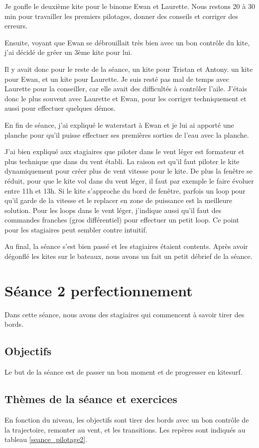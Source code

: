 \documentclass[11pt,a4paper]{report}
\begin{document}
Je gonfle le deuxième kite pour le binome Ewan et Laurette.
Nous restons 20 à 30 min pour travailler les premiers pilotages,
donner des conseils et corriger des erreurs.

Ensuite, voyant que Ewan se débrouillait très bien avec un bon contrôle du 
kite, j'ai décidé de gréer un 3ème kite pour lui.

Il y avait donc pour le reste de la séance, un kite pour Tristan et Antony.
un kite pour Ewan, et un kite pour Laurette. Je suis resté pas mal de temps
avec Laurette pour la conseiller, car elle avait des difficultés à contrôler l'aile.
J'étais donc le plus souvent avec Laurette et Ewan, pour les corriger techniquement 
et aussi pour effectuer quelques démos.

En fin de séance, j'ai expliqué le waterstart à Ewan et je lui ai
apporté une planche pour qu'il puisse effectuer ses premières sorties
de l'eau avec la planche.

J'ai bien expliqué aux stagiaires que piloter dans le vent léger est
formateur et plus technique que dans du vent établi. La raison est qu'il faut
piloter le kite dynamiquement pour créer plus de vent vitesse pour le kite.
De plus la fen\^etre se réduit, pour que le kite vol dans du vent léger, 
il faut par exemple le faire évoluer entre 11h et 13h. Si le kite s'approche du 
bord de fen\^etre, parfois un loop pour qu'il garde de la vitesse et le replacer
en zone de puissance est la meilleure solution.
Pour les loops dans le vent léger, j'indique aussi qu'il faut
des commandes franches (gros différentiel) pour effectuer un petit loop.
Ce point pour les stagiaires peut sembler contre intuitif.

Au final, la séance s'est bien passé et les stagiaires étaient contents.
Après avoir dégonflé les kites sur le bateaux, nous avons un fait un
petit débrief de la séance.

\section{Séance 2 perfectionnement}
Dans cette séance, nous avons des stagiaires qui commencent à savoir tirer des bords.
\subsection{Objectifs}
Le but de la séance est de passer un bon moment et de progresser en kitesurf.
\subsection{Thèmes de la séance et exercices}
En fonction du niveau, les objectifs sont tirer des bords avec un bon contrôle de la 
trajectoire, remonter au vent, et les transitions. Les repères sont indiqués
au tableau \ref{seance_pilotage2}.
\end{document}
